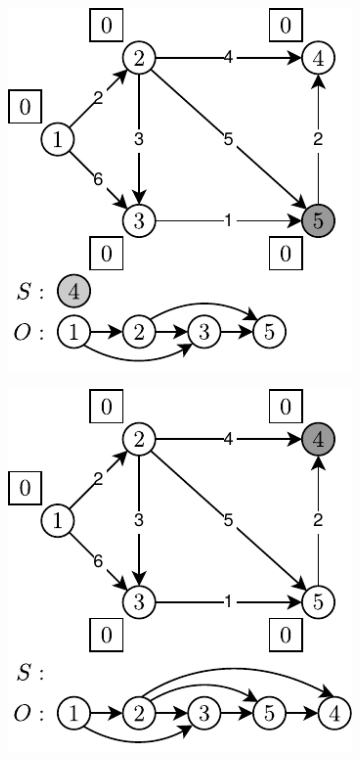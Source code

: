 \begin{figure}[!htbp]
\begin{subfigure}[b]{0.25\textwidth}
		\caption{}
	\end{subfigure}%
	\qquad
	\begin{subfigure}[b]{0.25\textwidth}
		\includegraphics[width=\textwidth]{Chapter_II/KHAN-TOPOLOGICAL-SORT-Example/e.pdf}
		\caption{}
	\end{subfigure}
	\qquad
	\begin{subfigure}[b]{0.25\textwidth}
		\includegraphics[width=\textwidth]{Chapter_II/KHAN-TOPOLOGICAL-SORT-Example/f.pdf}

\end{subfigure}
\end{figure}
